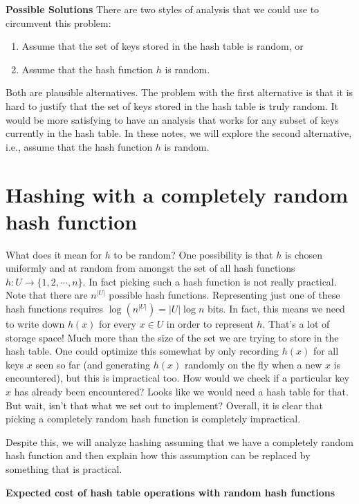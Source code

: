 \documentclass [12pt]{article}
\begin{document}
\textbf{Possible Solutions} 
There are two styles of analysis that we could use to circumvent this problem: 

\begin{enumerate}
  \item Assume that the set of keys stored in the hash table is random, or 
  \item Assume that the hash function $h$ is random. 
\end{enumerate}

Both are plausible alternatives. The problem with the first alternative is that it is hard to justify that the set of keys stored in the hash table is truly random. It would be more satisfying to have an analysis that works for any subset of keys currently in the hash table. In these notes, we will explore the second alternative, i.e., assume that the hash function $h$ is random.

\section{Hashing with a completely random hash function}

What does it mean for $h$ to be random? One possibility is that $h$ is chosen uniformly and at random from amongst the set of all hash functions $h : U → \{1, 2, \cdots , n\}$. In fact picking such a hash function is not really practical. Note that there are $n^{|U|}$ possible hash functions. Representing just one of these hash functions requires $\log ( n^{|U|} ) = |U|\log n$ bits. In fact, this means we need to write down $h(x)$ for every $x \in U$ in order to represent $h$. That's a lot of storage space! Much more than the size of the set we are trying to store in the hash table. One could optimize this somewhat by only recording $h(x)$ for all keys $x$ seen so far (and generating $h(x)$ randomly on the fly when a new $x$ is encountered), but this is impractical too. How would we check if a particular key $x$ has already been encountered? Looks like we would need a hash table for that. But wait, isn't that what we set out to implement? Overall, it is clear that picking a completely random hash function is completely impractical.

Despite this, we will analyze hashing assuming that we have a completely random hash function and then explain how this assumption can be replaced by something that is practical.

\textbf{Expected cost of hash table operations with random hash functions} 
\end{document}
